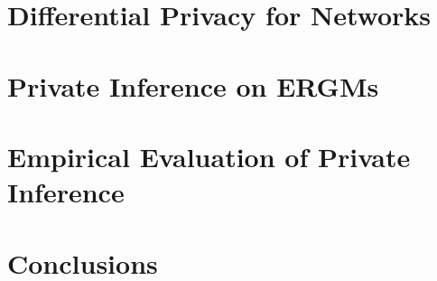 \documentclass[12pt]{report}
\begin{document}
	\chapter{Differential Privacy for Networks}\label{ch:dp_defns}
	
	
	
	
	
	\chapter{Private Inference on ERGMs}\label{ch:dp_stats}
	
	
	
	
	\chapter{Empirical Evaluation of Private Inference}\label{ch:experiments}
	
	
	
	\chapter{Conclusions}\label{conclusion}
	
	
	
	\cleardoublepage
	
\end{document}
